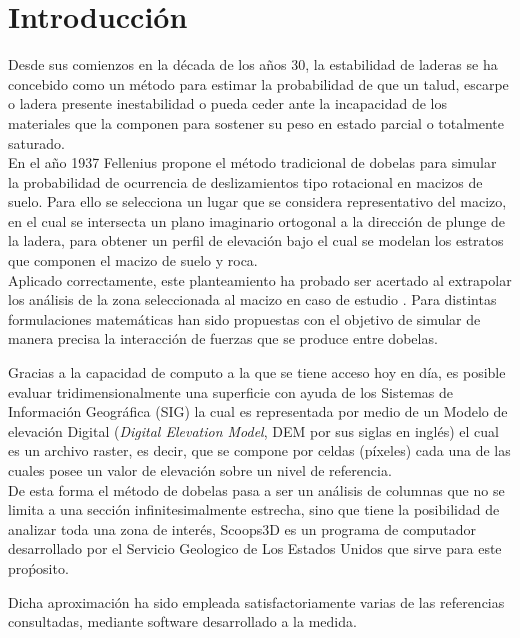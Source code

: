 \chapter{Introducci\'{o}n}
Desde sus comienzos en la d\'ecada de los a\~{n}os 30, la estabilidad de laderas se ha concebido como un m\'etodo para estimar la probabilidad de que un talud, escarpe o ladera presente inestabilidad o pueda ceder ante la incapacidad de los materiales que la componen para sostener su peso en estado parcial o totalmente saturado.\\


En el a\~{n}o 1937 Fellenius \cite{fellenius1936} propone el m\'etodo tradicional de dobelas para simular la probabilidad de ocurrencia de deslizamientos tipo rotacional en macizos de suelo. Para ello se selecciona un lugar que se considera representativo del macizo, en el cual se intersecta un plano imaginario ortogonal a la direcci\'on de plunge de la ladera, para obtener un perfil de elevaci\'on bajo el cual se modelan los estratos que componen el macizo de suelo y roca.\\

Aplicado correctamente, este planteamiento ha probado ser acertado al extrapolar los an\'alisis de la zona seleccionada al macizo en caso de estudio \cite{alonso1995effect}. Para distintas formulaciones matem\'aticas han sido propuestas  con el objetivo de simular de manera precisa la interacci\'on de fuerzas que se produce entre dobelas.

Gracias a la capacidad de computo a la que se tiene acceso hoy en d\'ia, es posible evaluar tridimensionalmente una superficie con ayuda de los Sistemas de Informaci\'on Geogr\'afica (SIG) la cual es representada por medio de un Modelo de elevaci\'on Digital (\textit{Digital Elevation Model}, DEM por sus siglas en ingl\'es) el cual es un archivo raster, es decir, que se compone por celdas (p\'ixeles) cada una de las cuales posee un valor de elevaci\'on sobre un nivel de referencia.
\\
De esta forma el m\'etodo de dobelas pasa a ser un an\'alisis de columnas que no se limita a una secci\'on infinitesimalmente estrecha, sino que tiene la posibilidad de analizar toda una zona de inter\'es, Scoops3D es un programa de computador desarrollado por el Servicio Geologico de Los Estados Unidos que sirve para este pro\'posito.

Dicha aproximaci\'on ha sido empleada satisfactoriamente varias de las referencias consultadas, mediante software desarrollado a la medida.  \cite{reid2015scoops3d} \cite{hungr1989evaluation}  \cite{stark1998performance} \par

